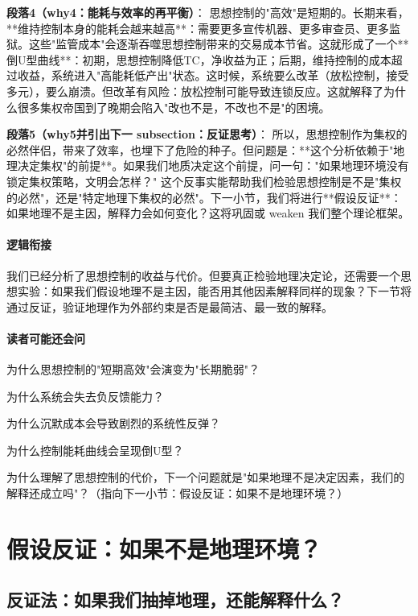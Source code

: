 \documentclass[openany, a4paper, 12pt]{book}
\begin{document}
	\textbf{段落4（why4：能耗与效率的再平衡）}：  
	思想控制的"高效"是短期的。长期来看，**维持控制本身的能耗会越来越高**：需要更多宣传机器、更多审查员、更多监狱。这些"监管成本"会逐渐吞噬思想控制带来的交易成本节省。这就形成了一个**倒U型曲线**：初期，思想控制降低TC，净收益为正；后期，维持控制的成本超过收益，系统进入"高能耗低产出"状态。这时候，系统要么改革（放松控制，接受多元），要么崩溃。但改革有风险：放松控制可能导致连锁反应。这就解释了为什么很多集权帝国到了晚期会陷入"改也不是，不改也不是"的困境。
	
	\textbf{段落5（why5并引出下一 subsection：反证思考）}：  
	所以，思想控制作为集权的必然伴侣，带来了效率，也埋下了危险的种子。但问题是：**这个分析依赖于"地理决定集权"的前提**。如果我们地质决定这个前提，问一句："如果地理环境没有锁定集权策略，文明会怎样？" 这个反事实能帮助我们检验思想控制是不是"集权的必然"，还是"特定地理下集权的必然"。下一小节，我们将进行**假设反证**：如果地理不是主因，解释力会如何变化？这将巩固或 weaken 我们整个理论框架。
	
	\paragraph*{逻辑衔接}
	我们已经分析了思想控制的收益与代价。但要真正检验地理决定论，还需要一个思想实验：如果我们假设地理不是主因，能否用其他因素解释同样的现象？下一节将通过反证，验证地理作为外部约束是否是最简洁、最一致的解释。
	
	\paragraph*{读者可能还会问}
	\item 为什么思想控制的"短期高效"会演变为"长期脆弱"？
	\item 为什么系统会失去负反馈能力？
	\item 为什么沉默成本会导致剧烈的系统性反弹？
	\item 为什么控制能耗曲线会呈现倒U型？
	\item 为什么理解了思想控制的代价，下一个问题就是"如果地理不是决定因素，我们的解释还成立吗"？（指向下一小节：假设反证：如果不是地理环境？）
	
	\section{假设反证：如果不是地理环境？}
	
	\subsection{反证法：如果我们抽掉地理，还能解释什么？}
	
\end{document}
